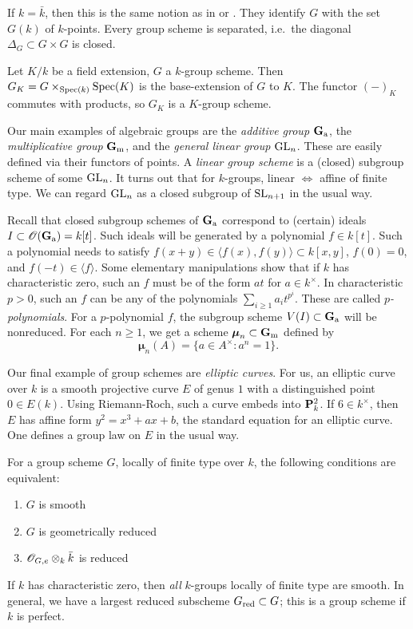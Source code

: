 If $k=\bar k$, then this is the same notion as in \cite{b91} or \cite{s09}. 
They identify $G$ with the set $G(k)$ of $k$-points. 
Every group scheme is separated, i.e.\ the diagonal $\Delta_G\subset G\times G$ 
is closed. 

Let $K/k$ be a field extension, $G$ a $k$-group scheme. Then 
$G_K=G\times_{\operatorname{Spec}(k)} \operatorname{Spec}(K)$ is the base-extension of $G$ to 
$K$. The functor $(-)_K$ commutes with products, so $G_K$ is a $K$-group 
scheme. 

Our main examples of algebraic groups are the \emph{additive group} 
$\mathbf{G}_{\mathrm{a}}$, the \emph{multiplicative group} $\mathbf{G}_{\mathrm{m}}$, and the 
\emph{general linear group} $\operatorname{GL}_n$. These are easily defined 
via their functors of points. A \emph{linear group scheme} is a (closed) 
subgroup scheme of some $\operatorname{GL}_n$. It turns out that for 
$k$-groups, linear $\Leftrightarrow$ affine of finite type. We can regard 
$\operatorname{GL}_n$ as a closed subgroup of $\operatorname{SL}_{n+1}$ in the 
usual way. 

Recall that closed subgroup schemes of $\mathbf{G}_{\mathrm{a}}$ correspond to 
(certain) 
ideals $I\subset \mathscr{O}(\mathbf{G}_{\mathrm{a}}) = k[t]$. Such ideals will be 
generated by a polynomial $f\in k[t]$. Such a polynomial needs to 
satisfy $f(x+y) \in \langle f(x),f(y)\rangle \subset k[x,y]$, 
$f(0)=0$, and $f(-t) \in \langle f\rangle$. Some elementary manipulations 
show that if $k$ has characteristic zero, such an $f$ must be of the 
form $a t$ for $a\in k^\times$. In characteristic $p>0$, such an $f$ can 
be any of the polynomials $\sum_{i\geqslant 1} a_i t^{p^i}$. These are 
called \emph{$p$-polynomials}. For a $p$-polynomial $f$, the subgroup 
scheme $V(I)\subset \mathbf{G}_{\mathrm{a}}$ will be nonreduced. For each 
$n\geqslant 1$, we get a scheme $\boldsymbol\mu_n\subset \mathbf{G}_{\mathrm{m}}$ defined 
by 
\[
  \boldsymbol\mu_n(A) = \{a\in A^\times:a^n=1\} .
\]

Our final example of group schemes are \emph{elliptic curves}. For us, 
an elliptic curve over $k$ is a smooth projective curve $E$ of genus $1$ 
with a distinguished point $0\in E(k)$. Using Riemann-Roch, such a curve 
embeds into $\mathbf{P}_k^2$. If $6\in k^\times$, then 
$E$ has affine form $y^2=x^3+a x+b$, the standard equation for an elliptic 
curve. One defines a group law on $E$ in the usual way. 

For a group scheme $G$, locally of finite type over $k$, the following 
conditions are equivalent:
\begin{enumerate}
  \item $G$ is smooth
  \item $G$ is geometrically reduced
  \item $\mathscr{O}_{G,e}\otimes_k \bar k$ is reduced
\end{enumerate}
If $k$ has characteristic zero, then \emph{all} $k$-groups locally of 
finite type are smooth. In general, we have a largest reduced 
subscheme $G_{\mathrm{red}}\subset G$; this is a group scheme if $k$ is 
perfect. 





